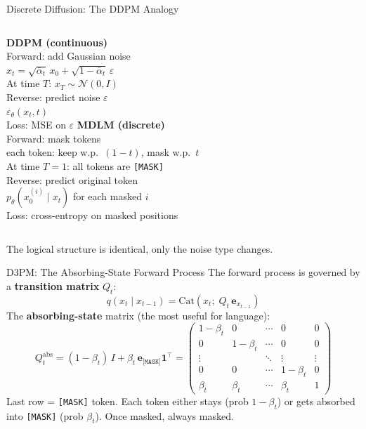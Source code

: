 \documentclass[10pt, aspectratio=169]{beamer}
\newcommand{\MASK}{\texttt{[MASK]}}
\begin{document}
\begin{frame}{Discrete Diffusion: The DDPM Analogy}
  \begin{columns}[T]
    \textbf{DDPM (continuous)}\\[6pt]
    Forward: add Gaussian noise\\
    \quad $x_t = \sqrt{\bar\alpha_t}\,x_0 + \sqrt{1-\bar\alpha_t}\,\varepsilon$\\[4pt]
    At time $T$: $x_T \sim \mathcal{N}(0,I)$\\[6pt]
    Reverse: predict noise $\varepsilon$\\
    \quad $\varepsilon_\theta(x_t, t)$\\[4pt]
    Loss: MSE on $\varepsilon$
    \textbf{MDLM (discrete)}\\[6pt]
    Forward: mask tokens\\
    \quad each token: keep w.p.\ $(1-t)$, mask w.p.\ $t$\\[4pt]
    At time $T=1$: all tokens are \MASK\\[6pt]
    Reverse: predict original token\\
    \quad $p_\theta(x_0^{(i)} \mid x_t)$ for each masked $i$\\[4pt]
    Loss: cross-entropy on masked positions
  \end{columns}
  \vspace{10pt}
  The logical structure is identical, only the noise type changes.
\end{frame}

\begin{frame}{D3PM: The Absorbing-State Forward Process}
  The forward process is governed by a \textbf{transition matrix} $Q_t$:
  \[
    q(x_t \mid x_{t-1}) = \mathrm{Cat}(x_t;\; Q_t\,\mathbf{e}_{x_{t-1}})
  \]
  The \textbf{absorbing-state} matrix (the most useful for language):
  \[
    Q_t^{\mathrm{abs}}
    = (1-\beta_t)\,I + \beta_t\,\mathbf{e}_{\MASK}\mathbf{1}^\top
    = \begin{pmatrix}
        1-\beta_t & 0 & \cdots & 0 & 0\\
        0 & 1-\beta_t & \cdots & 0 & 0\\
        \vdots & & \ddots & \vdots & \vdots\\
        0 & 0 & \cdots & 1-\beta_t & 0\\
        \beta_t & \beta_t & \cdots & \beta_t & 1
      \end{pmatrix}
  \]
  Last row = \MASK{} token. Each token either stays (prob $1-\beta_t$) or gets absorbed into \MASK{} (prob $\beta_t$). Once masked, always masked.
\end{frame}
\end{document}

